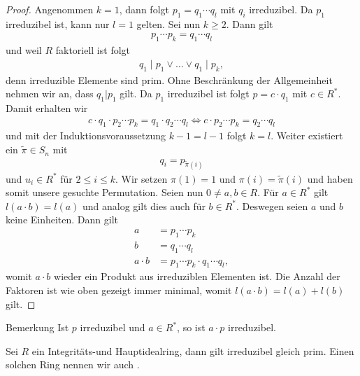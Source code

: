 \begin{proof}
	Angenommen $ k = 1 $, dann folgt
	$ p_1 = q_1 \cdots q_l $ mit $ q_i $ irreduzibel.
	Da $ p_1 $ irreduzibel ist, kann nur $ l = 1 $ gelten.
	Sei nun $ k \geq 2 $. Dann gilt
	\begin{align*}
	p_1 \cdots p_k = q_1 \cdots q_l
	\end{align*}
	und weil $ R $ faktoriell ist folgt
	\begin{align*}
	q_1 \mid p_1 \vee \dots \vee q_1 \mid p_k,
	\end{align*}
	denn irreduzible Elemente sind prim.
	Ohne Beschränkung der Allgemeinheit nehmen wir an, dass $ q_1 | p_1 $ gilt.
	Da $ p_1 $ irreduzibel ist folgt $ p = c \cdot q_1 $ mit $ c \in R^\ast $.
	Damit erhalten wir
	\begin{align*}
	c \cdot q_1 \cdot p_2 \cdots p_k = q_1 \cdot q_2 \cdots q_l
	\Leftrightarrow
	c \cdot p_2 \cdots p_k =  q_2 \cdots q_l
	\end{align*}
	und mit der Induktionsvoraussetzung $ k-1 = l-1 $ folgt $ k = l $.
	Weiter existiert ein $ \tilde{\pi} \in S_n $ mit
	\begin{align*}
	q_i = p_{\tilde{\pi}(i)}
	\end{align*}
	und $ u_i \in R^\ast $ für $ 2 \leq i \leq k $.
	Wir setzen $ \pi(1) = 1 $ und $ \pi(i) = \tilde{\pi}(i) $ und haben somit unsere gesuchte Permutation.
	Seien nun $ 0 \neq a,b \in R $.
	Für $ a \in R^\ast $ gilt $ l(a \cdot b) = l(a) $ und analog gilt dies auch für $ b \in R^\ast $.
	Deswegen seien $ a $ und $ b $ keine Einheiten. Dann gilt
	\begin{align*}
	a &= p_1 \cdots p_k\\
	b &= q_1 \cdots q_l\\
	a \cdot b &= p_1 \cdots p_k \cdot q_1 \cdots q_l,
	\end{align*}
	womit $ a \cdot b $ wieder ein Produkt aus irreduziblen Elementen ist.
	Die Anzahl der Faktoren ist wie oben gezeigt immer minimal, womit
	$ l(a \cdot b ) = l(a) + l(b)  $ gilt. 
\end{proof}

\begin{generic_no_num}{Bemerkung}
	Ist $ p $ irreduzibel und $ a \in R^\ast $, so ist $a \cdot p  $
	irreduzibel.
\end{generic_no_num}

\begin{lemma} \label{skript:9.6}
	Sei $ R $ ein Integritäts-und Hauptidealring,
	dann gilt irreduzibel gleich prim. 
	Einen solchen Ring nennen wir auch .
\end{lemma}

